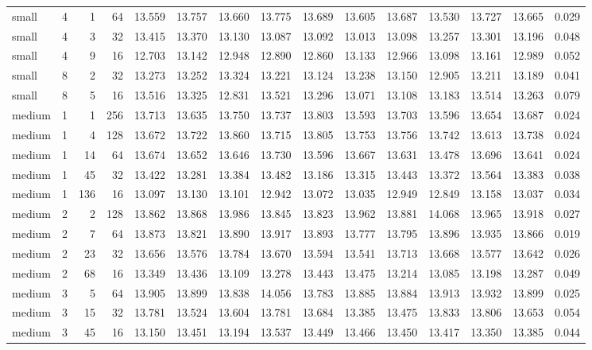 {\begin{longtable}{@{}lrrrrrrrrrrrrrr@{}}
small & 4 & 1 & 64 & 13.559 & 13.757 & 13.660 & 13.775 & 13.689 & 13.605 & 13.687 & 13.530 & 13.727 & 13.665 & 0.029 \\
small & 4 & 3 & 32 & 13.415 & 13.370 & 13.130 & 13.087 & 13.092 & 13.013 & 13.098 & 13.257 & 13.301 & 13.196 & 0.048 \\
small & 4 & 9 & 16 & 12.703 & 13.142 & 12.948 & 12.890 & 12.860 & 13.133 & 12.966 & 13.098 & 13.161 & 12.989 & 0.052 \\
small & 8 & 2 & 32 & 13.273 & 13.252 & 13.324 & 13.221 & 13.124 & 13.238 & 13.150 & 12.905 & 13.211 & 13.189 & 0.041 \\
small & 8 & 5 & 16 & 13.516 & 13.325 & 12.831 & 13.521 & 13.296 & 13.071 & 13.108 & 13.183 & 13.514 & 13.263 & 0.079 \\
medium & 1 & 1 & 256 & 13.713 & 13.635 & 13.750 & 13.737 & 13.803 & 13.593 & 13.703 & 13.596 & 13.654 & 13.687 & 0.024 \\
medium & 1 & 4 & 128 & 13.672 & 13.722 & 13.860 & 13.715 & 13.805 & 13.753 & 13.756 & 13.742 & 13.613 & 13.738 & 0.024 \\
medium & 1 & 14 & 64 & 13.674 & 13.652 & 13.646 & 13.730 & 13.596 & 13.667 & 13.631 & 13.478 & 13.696 & 13.641 & 0.024 \\
medium & 1 & 45 & 32 & 13.422 & 13.281 & 13.384 & 13.482 & 13.186 & 13.315 & 13.443 & 13.372 & 13.564 & 13.383 & 0.038 \\
medium & 1 & 136 & 16 & 13.097 & 13.130 & 13.101 & 12.942 & 13.072 & 13.035 & 12.949 & 12.849 & 13.158 & 13.037 & 0.034 \\
medium & 2 & 2 & 128 & 13.862 & 13.868 & 13.986 & 13.845 & 13.823 & 13.962 & 13.881 & 14.068 & 13.965 & 13.918 & 0.027 \\
medium & 2 & 7 & 64 & 13.873 & 13.821 & 13.890 & 13.917 & 13.893 & 13.777 & 13.795 & 13.896 & 13.935 & 13.866 & 0.019 \\
medium & 2 & 23 & 32 & 13.656 & 13.576 & 13.784 & 13.670 & 13.594 & 13.541 & 13.713 & 13.668 & 13.577 & 13.642 & 0.026 \\
medium & 2 & 68 & 16 & 13.349 & 13.436 & 13.109 & 13.278 & 13.443 & 13.475 & 13.214 & 13.085 & 13.198 & 13.287 & 0.049 \\
medium & 3 & 5 & 64 & 13.905 & 13.899 & 13.838 & 14.056 & 13.783 & 13.885 & 13.884 & 13.913 & 13.932 & 13.899 & 0.025 \\
medium & 3 & 15 & 32 & 13.781 & 13.524 & 13.604 & 13.781 & 13.684 & 13.385 & 13.475 & 13.833 & 13.806 & 13.653 & 0.054 \\
medium & 3 & 45 & 16 & 13.150 & 13.451 & 13.194 & 13.537 & 13.449 & 13.466 & 13.450 & 13.417 & 13.350 & 13.385 & 0.044 \\

\end{longtable}}
